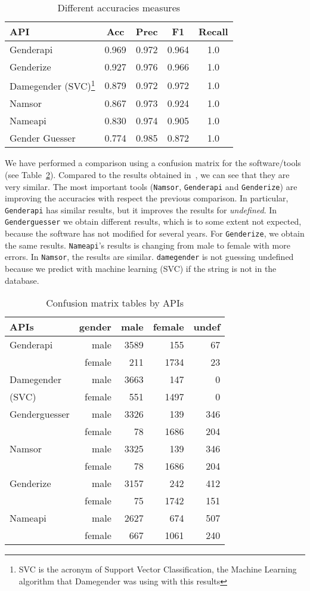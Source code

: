 \documentclass[a4paper]{article}
\begin{document}
\begin{table}[t]
\footnotesize
\begin{tabular}[]{lcccc}
  \hline
  API & Acc & Prec & F1 & Recall\tabularnewline
\hline
Genderapi & 0.969 & 0.972 & 0.964 & 1.0\tabularnewline
Genderize & 0.927 & 0.976 & 0.966 & 1.0\tabularnewline
Damegender (SVC)\footnote{SVC is the acronym of Support Vector Classification, the Machine Learning algorithm that Damegender was using with this results} & 0.879 & 0.972 & 0.972 & 1.0\tabularnewline
Namsor & 0.867 & 0.973 & 0.924 & 1.0\tabularnewline
Nameapi & 0.830 & 0.974 & 0.905 & 1.0\tabularnewline
Gender Guesser & 0.774 & 0.985 & 0.872 & 1.0\tabularnewline
\hline
\end{tabular}
\caption{Different accuracies measures}
\label{table:DifferentAccuraciesMeasures}
\end{table}

We have performed a comparison using a confusion matrix for the software/tools (see Table~\ref{table:ConfusionMatrixTables}).
Compared to the results obtained in~\cite{10.7717/peerj-cs.156}, we can see that they are very similar.
The most important tools (\texttt{Namsor}, \texttt{Genderapi} and \texttt{Genderize}) are improving the accuracies with respect the previous comparison.
In particular, \texttt{Genderapi} has similar results, but it improves the results for \emph{undefined}.
In \texttt{Genderguesser} we obtain different results, which is to some extent not expected, because the software has not modified for several years.
For \texttt{Genderize}, we obtain the same results. 
\texttt{Nameapi}'s results is changing from male to female with more errors. 
In \texttt{Namsor}, the results are similar. 
\texttt{damegender} is not guessing undefined because we predict with machine learning (SVC) if the string is not in the database.

\begin{table}[t]
\footnotesize
\begin{tabular}[]{lrrrr}
  \hline
  APIs          & gender & male & female & undef \tabularnewline
\hline
Genderapi         & male    & 3589 & 155  &  67 \tabularnewline
                  & female  & 211  & 1734 &  23 \tabularnewline
Damegender       & male    & 3663 & 147  &   0 \tabularnewline
(SVC)\footnotemark[1] & female  & 551  & 1497 &   0 \tabularnewline
Genderguesser     & male    & 3326 &  139 & 346 \tabularnewline
                  & female  & 78   & 1686 & 204 \tabularnewline
Namsor            & male    & 3325 & 139  & 346 \tabularnewline
                  & female  & 78   & 1686 & 204 \tabularnewline
Genderize         & male    & 3157 & 242  & 412 \tabularnewline
                  & female  & 75   & 1742 & 151 \tabularnewline
Nameapi           & male    & 2627 & 674  & 507 \tabularnewline
                  & female  & 667  & 1061 & 240 \tabularnewline 
\hline
\end{tabular}
\caption{Confusion matrix tables by APIs}
\label{table:ConfusionMatrixTables}
\end{table}
\end{document}
